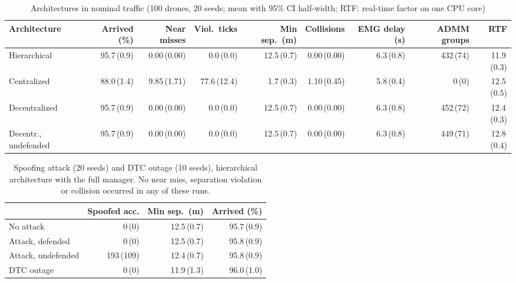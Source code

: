 \documentclass[journal]{IEEEtran}
\begin{document}
\begin{table}[t]
\centering
\caption{Architectures in nominal traffic (100 drones, 20 seeds; mean with 95\% CI half-width; RTF: real-time factor on one CPU core)}
\label{tab:s3}
\footnotesize
\setlength{\tabcolsep}{4pt}
\begin{tabular}{@{}lrrrrrrrr@{}}
\toprule
Architecture & Arrived (\%) & Near misses & Viol.\ ticks & Min sep.\ (m) & Collisions & EMG delay (s) & ADMM groups & RTF \\
\midrule
Hierarchical & 95.7\,{\scriptsize(0.9)} & 0.00\,{\scriptsize(0.00)} & 0.0\,{\scriptsize(0.0)} & 12.5\,{\scriptsize(0.7)} & 0.00\,{\scriptsize(0.00)} & 6.3\,{\scriptsize(0.8)} & 432\,{\scriptsize(74)} & 11.9\,{\scriptsize(0.3)} \\
Centralized & 88.0\,{\scriptsize(1.4)} & 9.85\,{\scriptsize(1.71)} & 77.6\,{\scriptsize(12.4)} & 1.7\,{\scriptsize(0.3)} & 1.10\,{\scriptsize(0.45)} & 5.8\,{\scriptsize(0.4)} & 0\,{\scriptsize(0)} & 12.5\,{\scriptsize(0.5)} \\
Decentralized & 95.7\,{\scriptsize(0.9)} & 0.00\,{\scriptsize(0.00)} & 0.0\,{\scriptsize(0.0)} & 12.5\,{\scriptsize(0.7)} & 0.00\,{\scriptsize(0.00)} & 6.3\,{\scriptsize(0.8)} & 452\,{\scriptsize(72)} & 12.4\,{\scriptsize(0.3)} \\
Decentr., undefended & 95.7\,{\scriptsize(0.9)} & 0.00\,{\scriptsize(0.00)} & 0.0\,{\scriptsize(0.0)} & 12.5\,{\scriptsize(0.7)} & 0.00\,{\scriptsize(0.00)} & 6.3\,{\scriptsize(0.8)} & 449\,{\scriptsize(71)} & 12.8\,{\scriptsize(0.4)} \\
\bottomrule
\end{tabular}
\end{table}

\begin{table}[t]
\centering
\caption{Spoofing attack (20 seeds) and DTC outage (10 seeds), hierarchical architecture with the full manager. No near miss, separation violation or collision occurred in any of these runs.}
\label{tab:s4}
\footnotesize
\begin{tabular}{@{}lrrr@{}}
\toprule
 & Spoofed acc. & Min sep.\ (m) & Arrived (\%) \\
\midrule
No attack & 0\,{\scriptsize(0)} & 12.5\,{\scriptsize(0.7)} & 95.7\,{\scriptsize(0.9)} \\
Attack, defended & 0\,{\scriptsize(0)} & 12.5\,{\scriptsize(0.7)} & 95.8\,{\scriptsize(0.9)} \\
Attack, undefended & 193\,{\scriptsize(109)} & 12.4\,{\scriptsize(0.7)} & 95.8\,{\scriptsize(0.9)} \\
DTC outage & 0\,{\scriptsize(0)} & 11.9\,{\scriptsize(1.3)} & 96.0\,{\scriptsize(1.0)} \\
\bottomrule
\end{tabular}
\end{table}
\end{document}
